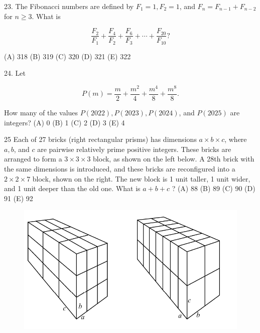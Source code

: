 \documentclass[12pt,a4paper]{book}
\theoremstyle{definition}
\begin{document}
23. The Fibonacci numbers are defined by $F_1=1, F_2=1$, and $F_n=F_{n-1}+F_{n-2}$ for $n \geq 3$. What is

$$
\frac{F_2}{F_1}+\frac{F_4}{F_2}+\frac{F_6}{F_3}+\cdots+\frac{F_{20}}{F_{10}} ?
$$

(A) 318
(B) 319
(C) 320
(D) 321
(E) 322

24. Let

$$
P(m)=\frac{m}{2}+\frac{m^2}{4}+\frac{m^4}{8}+\frac{m^8}{8} .
$$


How many of the values $P(2022), P(2023), P(2024)$, and $P(2025)$ are integers?
(A) 0
(B) 1
(C) 2
(D) 3
(E) 4

25
Each of 27 bricks (right rectangular prisms) has dimensions $a \times b \times c$, where $a, b$, and $c$ are pairwise relatively prime positive integers. These bricks are arranged to form a $3 \times 3 \times 3$ block, as shown on the left below. A 28th brick with the same dimensions is introduced, and these bricks are reconfigured into a $2 \times 2 \times 7$ block, shown on the right. The new block is 1 unit taller, 1 unit wider, and 1 unit deeper than the old one. What is $a+b+c$ ?
(A) 88
(B) 89
(C) 90
(D) 91
(E) 92

\begin{figure}[H]
    \includegraphics[height=0.3\textheight]{25-picture.png}
\end{figure}
\end{document}
